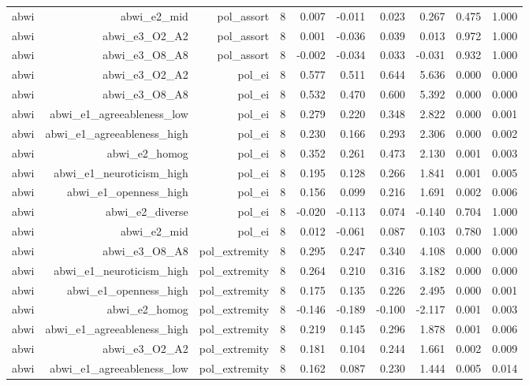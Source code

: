 \documentclass[11pt]{article}
\begin{document}
\begin{landscape}
\begin{longtable}{@{}lrrrrrrrrr@{}}
abwi & abwi\_e2\_mid & pol\_assort & 8 & 0.007 & -0.011 & 0.023 & 0.267 & 0.475 & 1.000 \\
abwi & abwi\_e3\_O2\_A2 & pol\_assort & 8 & 0.001 & -0.036 & 0.039 & 0.013 & 0.972 & 1.000 \\
abwi & abwi\_e3\_O8\_A8 & pol\_assort & 8 & -0.002 & -0.034 & 0.033 & -0.031 & 0.932 & 1.000 \\
abwi & abwi\_e3\_O2\_A2 & pol\_ei & 8 & 0.577 & 0.511 & 0.644 & 5.636 & 0.000 & 0.000 \\
abwi & abwi\_e3\_O8\_A8 & pol\_ei & 8 & 0.532 & 0.470 & 0.600 & 5.392 & 0.000 & 0.000 \\
abwi & abwi\_e1\_agreeableness\_low & pol\_ei & 8 & 0.279 & 0.220 & 0.348 & 2.822 & 0.000 & 0.001 \\
abwi & abwi\_e1\_agreeableness\_high & pol\_ei & 8 & 0.230 & 0.166 & 0.293 & 2.306 & 0.000 & 0.002 \\
abwi & abwi\_e2\_homog & pol\_ei & 8 & 0.352 & 0.261 & 0.473 & 2.130 & 0.001 & 0.003 \\
abwi & abwi\_e1\_neuroticism\_high & pol\_ei & 8 & 0.195 & 0.128 & 0.266 & 1.841 & 0.001 & 0.005 \\
abwi & abwi\_e1\_openness\_high & pol\_ei & 8 & 0.156 & 0.099 & 0.216 & 1.691 & 0.002 & 0.006 \\
abwi & abwi\_e2\_diverse & pol\_ei & 8 & -0.020 & -0.113 & 0.074 & -0.140 & 0.704 & 1.000 \\
abwi & abwi\_e2\_mid & pol\_ei & 8 & 0.012 & -0.061 & 0.087 & 0.103 & 0.780 & 1.000 \\
abwi & abwi\_e3\_O8\_A8 & pol\_extremity & 8 & 0.295 & 0.247 & 0.340 & 4.108 & 0.000 & 0.000 \\
abwi & abwi\_e1\_neuroticism\_high & pol\_extremity & 8 & 0.264 & 0.210 & 0.316 & 3.182 & 0.000 & 0.000 \\
abwi & abwi\_e1\_openness\_high & pol\_extremity & 8 & 0.175 & 0.135 & 0.226 & 2.495 & 0.000 & 0.001 \\
abwi & abwi\_e2\_homog & pol\_extremity & 8 & -0.146 & -0.189 & -0.100 & -2.117 & 0.001 & 0.003 \\
abwi & abwi\_e1\_agreeableness\_high & pol\_extremity & 8 & 0.219 & 0.145 & 0.296 & 1.878 & 0.001 & 0.006 \\
abwi & abwi\_e3\_O2\_A2 & pol\_extremity & 8 & 0.181 & 0.104 & 0.244 & 1.661 & 0.002 & 0.009 \\
abwi & abwi\_e1\_agreeableness\_low & pol\_extremity & 8 & 0.162 & 0.087 & 0.230 & 1.444 & 0.005 & 0.014 \\

\end{longtable}
\end{landscape}
\end{document}
